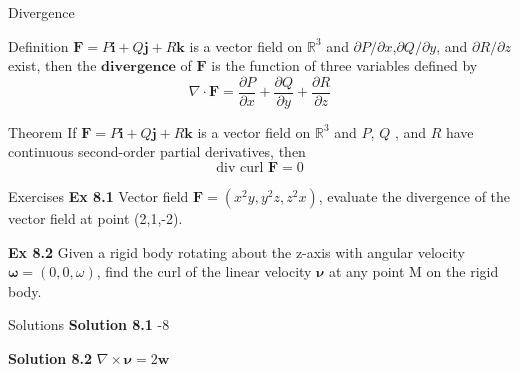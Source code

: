 \documentclass[aspectratio=169]{beamer}
\begin{document}
\begin{frame}{Divergence}
    \begin{block}{Definition}
        $\boldsymbol{F}=P\boldsymbol{i}+Q\boldsymbol{j}+R\boldsymbol{k}$ is a vector field on $\mathbb{R}^3$ and $\partial P/\partial x$,$\partial Q/\partial y$, and $\partial R/\partial z$ exist, then the $\boldsymbol{divergence}$ of $\boldsymbol{F}$ is the  function of three variables defined by
        \begin{equation*}
            \nabla \cdot \boldsymbol{F} = \frac{\partial P}{\partial x}+\frac{\partial Q}{\partial y}+\frac{\partial R}{\partial z}
        \end{equation*}
    \end{block}

    \begin{block}{Theorem}
        If $\boldsymbol{F}=P\boldsymbol{i}+Q\boldsymbol{j}+R\boldsymbol{k}$ is a vector field on $\mathbb{R}^3$ and $P$, $Q$ , and $R$ have continuous second-order partial derivatives, then
        \begin{equation*}
        \text{div curl }\boldsymbol{F}=0
        \end{equation*}
    \end{block}
\end{frame}

\begin{frame}{Exercises}
    \textbf{Ex 8.1} Vector field $\boldsymbol{F}=(x^2y,y^2z,z^2x)$, evaluate the divergence of  the vector field at point (2,1,-2).\\
    \par
    \textbf{Ex 8.2} Given a rigid body rotating about the z-axis with angular velocity $\boldsymbol{\omega}=(0,0,\omega)$, find the curl of the linear velocity $\boldsymbol{\nu}$ at any point M on the rigid body.\\
    \par
\end{frame}

\begin{frame}{Solutions}
    \textbf{Solution 8.1} -8\\
    \par
    \textbf{Solution 8.2} $\nabla\times \boldsymbol{\nu}=2\boldsymbol{w}$
\end{frame}
\end{document}

